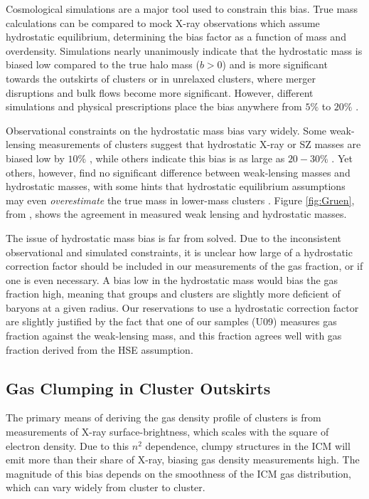 Cosmological simulations are a major tool used to constrain this bias.
True mass calculations can be compared to mock X-ray observations
which assume hydrostatic equilibrium, determining the bias factor as a
function of mass and overdensity. Simulations nearly unanimously
indicate that the hydrostatic mass is biased low compared to the true
halo mass ($b>0$) and is more significant towards the outskirts of
clusters or in unrelaxed clusters, where merger disruptions and bulk flows
become more significant. However, different simulations and physical
prescriptions place the bias anywhere from $5\%$
 to $20\%$
.

Observational constraints on the hydrostatic mass bias vary
widely. Some weak-lensing measurements of clusters suggest that
hydrostatic X-ray or SZ masses are biased low by $10\%$
\citep{Andersson2011,High2012}, while others indicate this bias is as
large as $20-30\%$
\citep{Arnaud2007,Ichikawa2013,VonderLinden2014}. Yet others, however,
find no significant difference between weak-lensing masses and
hydrostatic masses, with some hints that hydrostatic equilibrium
assumptions may even \textit{overestimate} the true mass in lower-mass
clusters \citep{Gruen2013, Israel2014}. Figure \ref{fig:Gruen}, from
\citet{Gruen2013}, shows the agreement in measured weak lensing and
hydrostatic masses. 


\afterpage{\clearpage}

The issue of hydrostatic mass bias is far from solved. Due to the
inconsistent observational and simulated constraints, it is unclear
how large of a hydrostatic correction factor should be included in our
measurements of the gas fraction, or if one is even necessary. A bias
low in the hydrostatic mass would bias the gas fraction high, meaning
that groups and clusters are slightly more deficient of baryons at a
given radius. Our reservations to use a hydrostatic correction factor
are slightly justified by the fact that one of our samples (U09)
measures gas fraction against the weak-lensing mass, and this fraction
agrees well with gas fraction derived from the HSE
assumption.

\subsection{Gas Clumping in Cluster Outskirts}
\label{sec:Limitations.Clumping}

The primary means of deriving the gas density profile of clusters is
from measurements of X-ray surface-brightness, which scales with the
square of electron density. Due to this $n^2$ dependence, clumpy
structures in the ICM will emit more than their share of X-ray,
biasing gas density measurements high. The magnitude of this bias
depends on the smoothness of the ICM gas distribution, which can vary
widely from cluster to cluster. 

